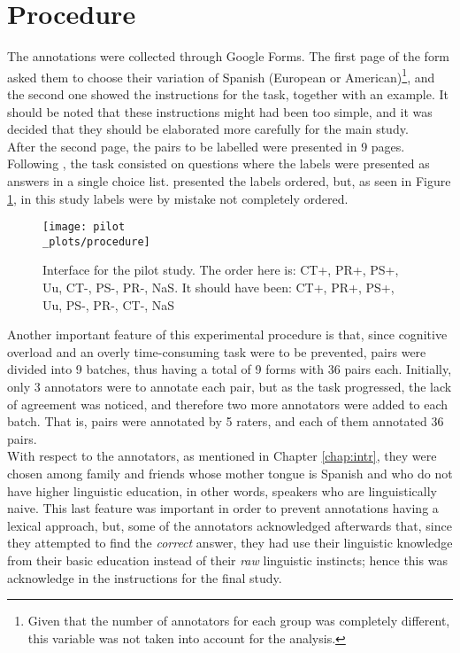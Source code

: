 \section{Procedure}
\label{sec:pilproc}

The annotations were collected through Google Forms. The first page of the form asked them to choose their variation of Spanish (European or American)\footnote{Given that the number of annotators for each group was completely different, this variable was not taken into account for the analysis.}, and the second one showed the instructions for the task, together with an example. It should be noted that these instructions might had been too simple, and it was decided that they should be elaborated more carefully for the main study.\\

After the second page, the pairs to be labelled were presented in 9 pages. Following \citet{de2012did}, the task consisted on questions where the labels were presented as answers in a single choice list. \citet{de2012did} presented the labels ordered, but, as seen in Figure \ref{fig:proc}, in this study labels were by mistake not completely ordered.\\ 

\begin{figure}
\centering
\parbox{12.5cm}{\texttt{[image: pilot\\\_plots/procedure]}
\caption[Interface for the pilot study.]{Interface for the pilot study. The order here is: CT+, PR+, PS+, Uu, CT-, PS-, PR-, NaS. It should have been: CT+, PR+, PS+, Uu, PS-, PR-, CT-, NaS}\label{fig:proc}}
\qquad
\end{figure}

Another important feature of this experimental procedure is that, since cognitive overload and an overly time-consuming task were to be prevented, pairs were divided into 9 batches, thus having a total of 9 forms with 36 pairs each. Initially, only 3 annotators were to annotate each pair, but as the task progressed, the lack of agreement was noticed, and therefore two more annotators were added to each batch. That is, pairs were annotated by 5 raters, and each of them annotated 36 pairs.\\

With respect to the annotators, as mentioned in Chapter \ref{chap:intr}, they were chosen among family and friends whose mother tongue is Spanish and who do not have higher linguistic education, in other words, speakers who are linguistically naive. This last feature was important in order to prevent annotations having a lexical approach, but, some of the annotators acknowledged afterwards that, since they attempted to find the \textit{correct} answer, they had use their linguistic knowledge from their basic education instead of their \textit{raw} linguistic instincts; hence this was acknowledge in the instructions for the final study.\\


